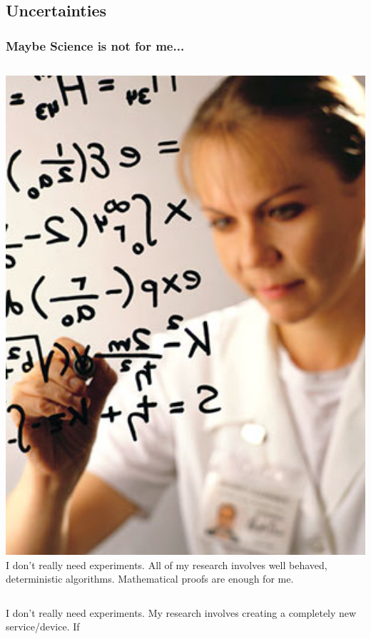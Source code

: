 \documentclass{beamer}
\begin{document}
\subsection{Uncertainties}
\begin{frame}
  \frametitle{Maybe Science is not for me...}
  \begin{block}{}
    \begin{columns}[c]
      \includegraphics[width=1\textwidth]{img/mathematician}
       I don't really need experiments. All of
      my research involves well behaved, deterministic
      algorithms. Mathematical proofs are enough for me.
    \end{columns}
  \end{block}
  \begin{block}{}
    \begin{columns}[c]
       I don't really need experiments. My
      research involves creating a completely new service/device. If

\end{columns}
\end{block}
\end{frame}
\end{document}
